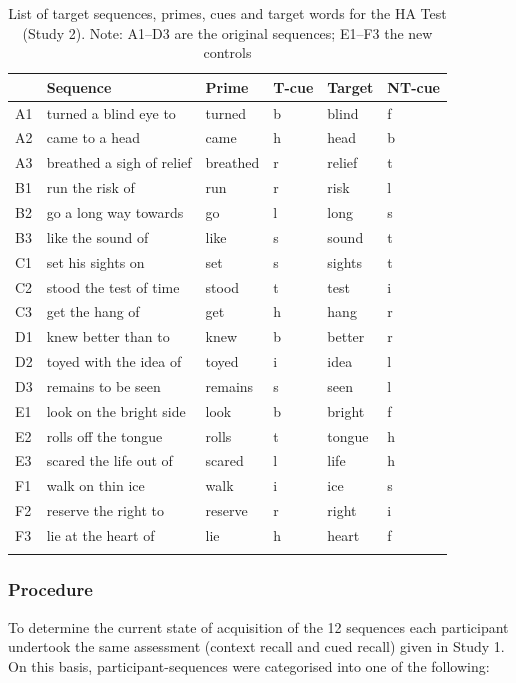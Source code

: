 \documentclass[output=paper]{langscibook}
\begin{document}
\begin{table}
\caption{List of target sequences, primes, cues and target words for the HA Test (Study 2). Note: A1--D3 are the original sequences; E1--F3 the new controls\label{tab:cutler:Appendixtable}}
\begin{tabular}{llllll}
\lsptoprule
   & Sequence & Prime & T-cue & Target & NT-cue\\\midrule
A1 & turned a blind eye to & turned & b & blind & f\\
A2 & came to a head & came & h & head & b\\
A3 & breathed a sigh of relief & breathed & r & relief & t\\
B1 & run the risk of & run & r & risk & l\\
B2 & go a long way towards & go & l & long & s\\
B3 & like the sound of & like & s & sound & t\\
C1 & set his sights on & set & s & sights & t\\
C2 & stood the test of time & stood & t & test & i\\
C3 & get the hang of & get & h & hang & r\\
D1 & knew better than to & knew & b & better & r\\
D2 & toyed with the idea of & toyed & i & idea & l\\
D3 & remains to be seen & remains & s & seen & l\\
E1 & look on the bright side & look & b & bright & f\\
E2 & rolls off the tongue & rolls & t & tongue & h\\
E3 & scared the life out of & scared & l & life & h\\
F1 & walk on thin ice & walk & i & ice & s\\
F2 & reserve the right to & reserve & r & right & i\\
F3 & lie at the heart of & lie & h & heart & f\\
\lspbottomrule
\end{tabular}
\end{table}

\subsubsection{Procedure}
To determine the current state of acquisition of the 12 sequences each participant undertook the same assessment (context recall and cued recall) given in Study 1. On this basis, participant-sequences were categorised into one of the following:
\end{document}
